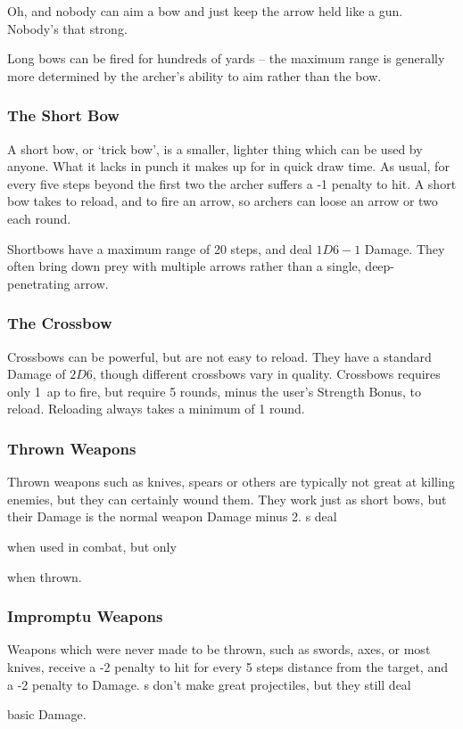 \begin{multicols}{2}
{  Oh, and nobody can aim a bow and just keep the arrow held like a gun.
  Nobody's that strong.
}

Long bows can be fired for hundreds of yards -- the maximum range is generally more determined by the archer's ability to aim rather than the bow.

\subsubsection{The Short Bow}

A short bow, or `trick bow', is a smaller, lighter thing which can be used by anyone.
What it lacks in punch it makes up for in quick draw time.
As usual, for every five steps beyond the first two the archer suffers a -1 penalty to hit.
A short bow takes  to reload, and  to fire an arrow, so archers can loose an arrow or two each round.

Shortbows have a maximum range of 20 steps, and deal $1D6-1$ Damage.
They often bring down prey with multiple arrows rather than a single, deep-penetrating arrow.

\subsubsection{The Crossbow}
\label{crossbow}
Crossbows can be powerful, but are not easy to reload.
They have a standard Damage of $2D6$, though different crossbows vary in quality.
Crossbows requires only 1~\gls{ap} to fire, but require 5 rounds, minus the user's Strength Bonus, to reload.
Reloading always takes a minimum of 1 round.

\subsubsection{Thrown Weapons}

Thrown weapons such as knives, spears or others are typically not great at killing enemies, but they can certainly wound them.
They work just as short bows, but their Damage is the normal weapon Damage minus 2.
\javelin s deal
\addtocounter{damage}{4}
when used in combat, but only
\addtocounter{damage}{-2}%
 when thrown.

\subsubsection{Impromptu Weapons}
\label{impromptuRanged}

Weapons which were never made to be thrown, such as swords, axes, or most knives, receive a -2 penalty to hit for every 5 steps distance from the target, and a -2 penalty to Damage.
\longsword s don't make great projectiles, but they still deal
\addtocounter{damage}{2} 
basic Damage.

\end{multicols}

